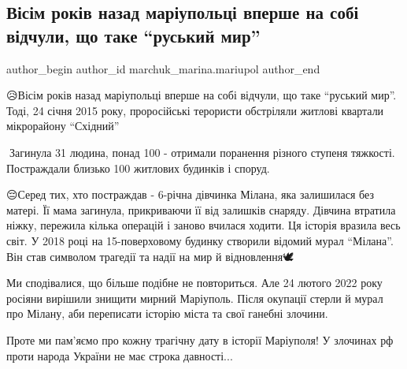  
 
 
 
 

\subsection{Вісім років назад маріупольці вперше на собі відчули, що таке \enquote{руський мир}}
\label{sec:24_01_2023.fb.marchuk_marina.mariupol.1.v_s_m_rok_v_nazad_ma}

\ifcmt
 author_begin
   author_id marchuk_marina.mariupol
 author_end
\fi

😥Вісім років назад маріупольці вперше на собі відчули, що таке \enquote{руський мир}.
Тоді, 24 січня 2015 року, проросійські терористи обстріляли житлові квартали
мікрорайону \enquote{Східний}

🥺Загинула 31 людина, понад 100 - отримали поранення різного ступеня тяжкості.
Постраждали близько 100 житлових будинків і споруд. 

😔Серед тих, хто постраждав - 6-річна дівчинка Мілана, яка залишилася без
матері. Її мама загинула, прикриваючи її від залишків снаряду. Дівчина втратила
ніжку, пережила кілька операцій і заново вчилася ходити. Ця історія вразила
весь світ.  У 2018 році на 15-поверховому будинку створили відомий мурал
\enquote{Мілана}. Він став символом трагедії та надії на мир й відновлення🕊

Ми сподівалися, що більше подібне не повториться. Але 24 лютого 2022 року
росіяни вирішили знищити мирний Маріуполь. Після окупації стерли й мурал про
Мілану, аби переписати історію міста та свої ганебні злочини. 

Проте ми пам'яємо про кожну трагічну дату в історії Маріуполя! У злочинах рф
проти народа України не має строка давності...
